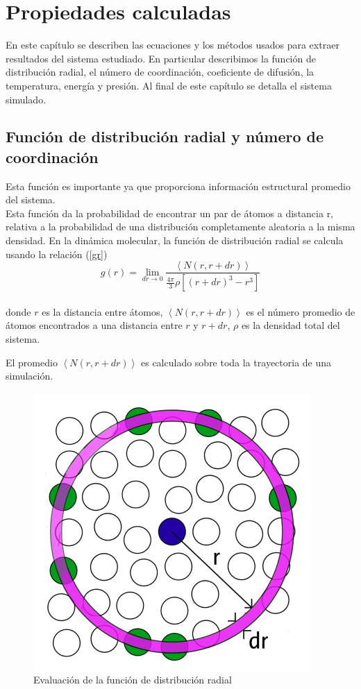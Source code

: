 \chapter{Propiedades calculadas}

En este capítulo se describen las ecuaciones y los métodos usados para extraer resultados del sistema estudiado. En particular describimos la función de distribución radial, el número de coordinación, coeficiente de difusión,  la temperatura, energía y presión. Al final de este capítulo se detalla el sistema simulado.

\section{Función de distribución radial y número de coordinación}

Esta función es importante ya que proporciona información estructural promedio del sistema.\\

Esta función da la probabilidad de encontrar un par de átomos a distancia r, relativa a la probabilidad de una distribución completamente aleatoria a la misma densidad. En la dinámica molecular, la función de distribución radial se calcula usando la relación (\ref{gr})\\

\begin{equation} \label{gr}
    g(r)=\lim_{dr\to 0} \frac{\left<N(r, r+dr)\right>}{\frac{4 \pi}{3} \rho \left[(r+dr)^3 - r^3\right]}
\end{equation}\\

\noindent donde $r$ es la distancia entre átomos, $\left<N(r, r+dr)\right>$ es el número promedio de átomos encontrados a una distancia entre $r$ y $r + dr$, $\rho$ es la densidad total del sistema.

El promedio $\left<N(r, r+dr)\right>$ es calculado sobre toda la trayectoria de una simulación.

\begin{figure}[!h]
    \centering
    \includegraphics[width=.2\textwidth,keepaspectratio=true]{gr.png}
    \caption{Evaluación de la función de distribución radial}
    \label{fig:gr}
\end{figure}

